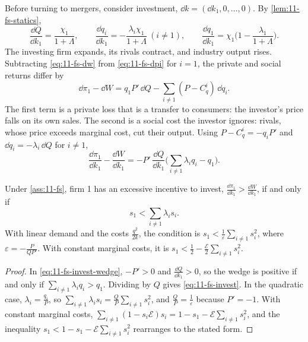 Before turning to mergers, consider investment, $\dd k = (\dd k_1, 0, \dots, 0)$. By \cref{lem:11-fs-statics},
\begin{equation*}
\frac{\dd Q}{\dd k_1} = \frac{\chi_1}{1 + \Lambda}, \qquad
\frac{\dd q_i}{\dd k_1} = -\frac{\lambda_i\chi_1}{1 + \Lambda}\ (i \ne 1), \qquad
\frac{\dd q_1}{\dd k_1} = \chi_1\Big(1 - \frac{\lambda_1}{1 + \Lambda}\Big).
\end{equation*}
The investing firm expands, its rivals contract, and industry output rises. Subtracting \eqref{eq:11-fs-dw} from
\eqref{eq:11-fs-dpi} for $i = 1$, the private and social returns differ by
\begin{equation}\label{eq:11-fs-invest-wedge0}
\dd\pi_1 - \dd W = q_1 P'\,\dd Q - \sum_{i \ne 1}(P - C^i_q)\,\dd q_i .
\end{equation}
The first term is a private loss that is a transfer to consumers: the investor's price falls on its own sales. The
second is a social cost the investor ignores: rivals, whose price exceeds marginal cost, cut their output. Using
$P - C^i_q = -q_i P'$ and $\dd q_i = -\lambda_i\,\dd Q$ for $i \ne 1$,
\begin{equation}\label{eq:11-fs-invest-wedge}
\frac{\dd\pi_1}{\dd k_1} - \frac{\dd W}{\dd k_1}
= -P'\,\frac{\dd Q}{\dd k_1}\Big(\sum_{i \ne 1}\lambda_i q_i - q_1\Big).
\end{equation}

\begin{proposition}\label{prop:11-fs-invest}
Under \cref{ass:11-fs}, firm 1 has an excessive incentive to invest, $\frac{\dd\pi_1}{\dd k_1} >
\frac{\dd W}{\dd k_1}$, if and only if
\begin{equation}\label{eq:11-fs-invest}
s_1 < \sum_{i \ne 1}\lambda_i s_i .
\end{equation}
With linear demand and the costs $\frac{q^2}{2k}$, the condition is $s_1 < \frac{1}{\varepsilon}\sum_{i \ne 1}s_i^2$,
where $\varepsilon = -\frac{P}{QP'}$. With constant marginal costs, it is
$s_1 < \frac{1}{2} - \frac{\mathcal{E}}{2}\sum_{i \ne 1}s_i^2$.
\end{proposition}

\begin{proof}
In \eqref{eq:11-fs-invest-wedge}, $-P' > 0$ and $\frac{\dd Q}{\dd k_1} > 0$, so the wedge is positive if and only
if $\sum_{i \ne 1}\lambda_i q_i > q_1$. Dividing by $Q$ gives \eqref{eq:11-fs-invest}. In the quadratic case,
$\lambda_i = \frac{q_i}{P}$, so $\sum_{i \ne 1}\lambda_i s_i = \frac{Q}{P}\sum_{i \ne 1}s_i^2$, and
$\frac{Q}{P} = \frac{1}{\varepsilon}$ because $P' = -1$. With constant marginal costs,
$\sum_{i \ne 1}(1 - s_i\mathcal{E})s_i = 1 - s_1 - \mathcal{E}\sum_{i \ne 1}s_i^2$, and the inequality
$s_1 < 1 - s_1 - \mathcal{E}\sum_{i \ne 1}s_i^2$ rearranges to the stated form.
\end{proof}

